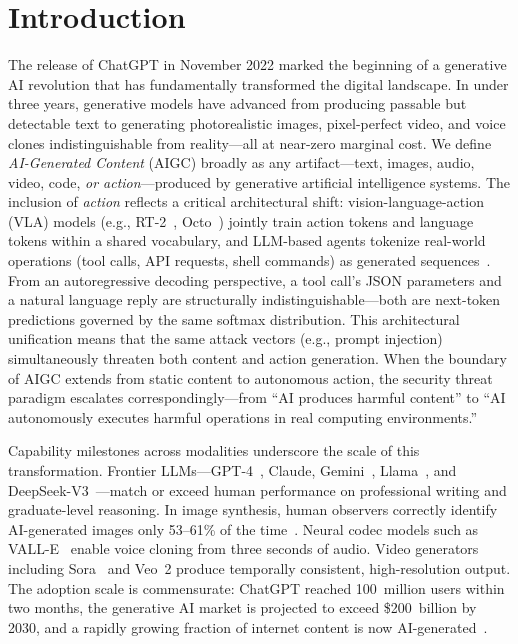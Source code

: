 
\section{Introduction}
\label{sec:introduction}


The release of ChatGPT in November 2022 marked the beginning of a generative AI revolution that has fundamentally transformed the digital landscape. In under three years, generative models have advanced from producing passable but detectable text to generating photorealistic images, pixel-perfect video, and voice clones indistinguishable from reality---all at near-zero marginal cost. We define \emph{AI-Generated Content} (AIGC) broadly as any artifact---text, images, audio, video, code, \emph{or action}---produced by generative artificial intelligence systems. The inclusion of \emph{action} reflects a critical architectural shift: vision-language-action (VLA) models (e.g., RT-2~\cite{brohan2023rt2}, Octo~\cite{team2024octo}) jointly train action tokens and language tokens within a shared vocabulary, and LLM-based agents tokenize real-world operations (tool calls, API requests, shell commands) as generated sequences~\cite{wang2024agentsurvey}. From an autoregressive decoding perspective, a tool call's JSON parameters and a natural language reply are structurally indistinguishable---both are next-token predictions governed by the same softmax distribution. This architectural unification means that the same attack vectors (e.g., prompt injection) simultaneously threaten both content and action generation. When the boundary of AIGC extends from static content to autonomous action, the security threat paradigm escalates correspondingly---from ``AI produces harmful content'' to ``AI autonomously executes harmful operations in real computing environments.''

Capability milestones across modalities underscore the scale of this transformation. Frontier LLMs---GPT-4~\cite{gpt4}, Claude, Gemini~\cite{gemini2024}, Llama~\cite{llama3}, and DeepSeek-V3~\cite{deepseekv3}---match or exceed human performance on professional writing and graduate-level reasoning. In image synthesis, human observers correctly identify AI-generated images only 53--61\% of the time~\cite{microsoft2025human}. Neural codec models such as VALL-E~\cite{wang2023valle} enable voice cloning from three seconds of audio. Video generators including Sora~\cite{brooks2024sora} and Veo~2 produce temporally consistent, high-resolution output. The adoption scale is commensurate: ChatGPT reached 100~million users within two months, the generative AI market is projected to exceed \$200~billion by 2030, and a rapidly growing fraction of internet content is now AI-generated~\cite{graphite2025aicontent}.

